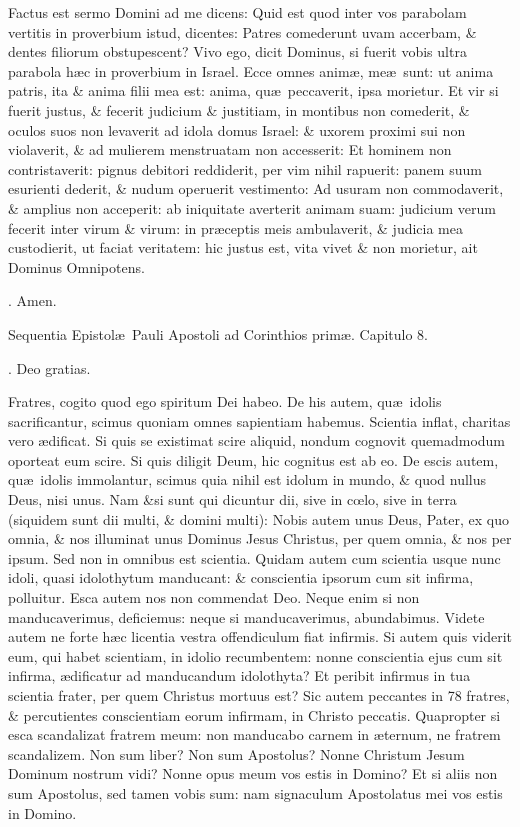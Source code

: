 \documentclass[letter,11pt]{book}
\makeatletter
\DeclareRobustCommand{\Rbar}{\vers@resp{0pt}{R}}
\newcommand{\vers@resp@sym}{\raisebox{0.2ex}{\rotatebox[origin=c]{-20}{$\m@th\rceil$}}}
\newcommand{\vers@resp}[2]{%
  {\ooalign{\hidewidth\kern#1\vers@resp@sym\hidewidth\cr#2\cr}}%
}%
\def\R{\color{Red} \Rbar . \color{black}}
\makeatother
\begin{document}
\begin{multicols*}{2}
Factus est sermo Domini ad me dicens: Quid est quod inter vos parabolam vertitis in proverbium istud, dicentes: Patres comederunt uvam accerbam, \& dentes filiorum obstupescent? Vivo ego, dicit Dominus, si fuerit vobis ultra parabola h\ae c in proverbium in Israel. Ecce omnes anim\ae , me\ae \ sunt: ut anima patris, ita \& anima filii mea est: anima, qu\ae \ peccaverit, ipsa morietur. Et vir si fuerit justus, \& fecerit judicium \& justitiam, in montibus non comederit, \& oculos suos non levaverit ad idola domus Israel: \& uxorem proximi sui non violaverit, \& ad mulierem menstruatam non accesserit: Et hominem non contristaverit: pignus debitori reddiderit, per vim nihil rapuerit: panem suum esurienti dederit, \& nudum operuerit vestimento: Ad usuram non commodaverit, \& amplius non acceperit: ab iniquitate averterit animam suam: judicium verum fecerit inter virum \& virum: in pr\ae ceptis meis ambulaverit, \& judicia mea custodierit, ut faciat veritatem: hic justus est, vita vivet \& non morietur, ait Dominus Omnipotens.

\R Amen.

Sequentia Epistol\ae \ Pauli Apostoli ad Corinthios prim\ae . Capitulo 8.

\R Deo gratias.

Fratres, cogito quod ego spiritum Dei habeo. De his autem, qu\ae \ idolis sacrificantur, scimus quoniam omnes sapientiam habemus. Scientia inflat, charitas vero \ae dificat. Si quis se existimat scire aliquid, nondum cognovit quemadmodum oporteat eum scire. Si quis diligit Deum, hic cognitus est ab eo. De escis autem, qu\ae \ idolis immolantur, scimus quia nihil est idolum in mundo, \& quod nullus Deus, nisi unus. Nam \&si sunt qui dicuntur dii, sive in c\oe lo, sive in terra (siquidem sunt dii multi, \& domini multi): Nobis autem unus Deus, Pater, ex quo omnia, \& nos illuminat unus Dominus Jesus Christus, per quem omnia, \& nos per ipsum. Sed non in omnibus est scientia. Quidam autem cum scientia usque nunc idoli, quasi idolothytum manducant: \& conscientia ipsorum cum sit infirma, polluitur. Esca autem nos non commendat Deo. Neque enim si non manducaverimus, deficiemus: neque si manducaverimus, abundabimus. Videte autem ne forte h\ae c licentia vestra offendiculum fiat infirmis. Si autem quis viderit eum, qui habet scientiam, in idolio recumbentem: nonne conscientia ejus cum sit infirma, \ae dificatur ad manducandum idolothyta? Et peribit infirmus in tua scientia frater, per quem Christus mortuus est? Sic autem peccantes in 78 fratres, \& percutientes conscientiam eorum infirmam, in Christo peccatis. Quapropter si esca scandalizat fratrem meum: non manducabo carnem in \ae ternum, ne fratrem scandalizem. Non sum liber? Non sum Apostolus? Nonne Christum Jesum Dominum nostrum vidi? Nonne opus meum vos estis in Domino? Et si aliis non sum Apostolus, sed tamen vobis sum: nam signaculum Apostolatus mei vos estis in Domino.


\end{multicols*}
\end{document}
